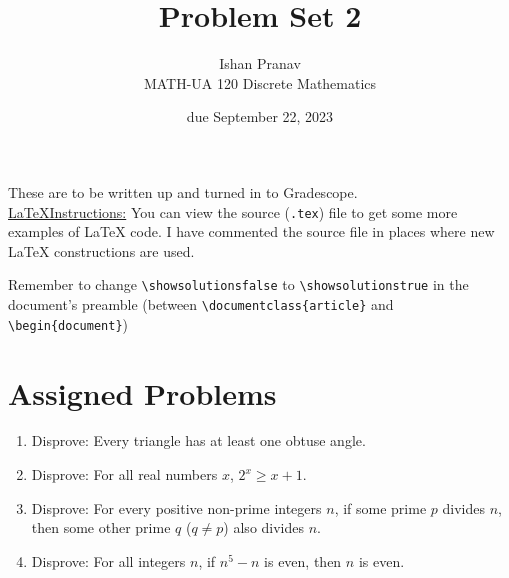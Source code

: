 \documentclass{article}
\title{Problem Set 2}
\author{%
    Ishan Pranav
\\  MATH-UA 120 Discrete Mathematics
}
\date{due September 22, 2023}
\newif\ifshowsolutions
\newcommand{\danger}{\marginpar[\hfill\dbend]{\dbend\hfill}}
\theoremstyle{definition}
\begin{document}
\maketitle
These are to be written up and turned in to Gradescope.\\
\ifshowsolutions
    \SetupExSheets{solution/print=true}
\else
    \danger
 \underline{ \LaTeX  Instructions:}  You can view the source (\texttt{.tex}) file to get some more examples of \LaTeX{} code.  I have commented the source file in places where new \LaTeX{} constructions are used.
  
  Remember to change \verb|\showsolutionsfalse| to \verb|\showsolutionstrue|
    in the document's preamble 
    (between \verb|\documentclass{article}| and \verb|\begin{document}|)
\fi
\section*{Assigned Problems}
\begin{question}
    \begin{enumerate}
        \item Disprove: Every triangle has at least one obtuse angle.
        \item Disprove: For all real numbers $x$, $2^x\geq x+1$.
        \item Disprove: For every positive non-prime integers $n$, if some prime $p$ divides $n$, 
            then some other prime $q$ ($q\neq p$) also divides $n$.
        \item Disprove: For all integers $n$, if $n^5-n$ is even, then $n$ is even.
    \end{enumerate}
\end{question}
\end{document}
